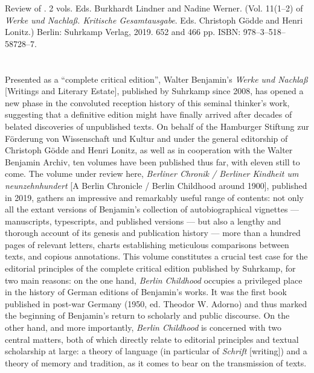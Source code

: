 

\begin{review}
\renewcommand*{\pagemark}{}

\begin{reviewed}
Review of \thecontribution. 2 vols. Eds. Burkhardt Lindner and Nadine
Werner. (Vol. 11(1--2) of \emph{Werke und Nachlaß. Kritische
Gesamtausgabe}. Eds. Christoph Gödde and Henri Lonitz.) Berlin: Suhrkamp Verlag, 2019. 652 and 466 pp. ISBN: 978--3--518--58728--7.
\end{reviewed}

\section*{} 
Presented as a ``complete critical edition'', Walter Benjamin's
\emph{Werke und Nachlaß} {[}Writings and Literary Estate{]}, published
by Suhrkamp since 2008, has opened a new phase in the convoluted
reception history of this seminal thinker's work, suggesting that a
definitive edition might have finally arrived after decades of belated
discoveries of unpublished texts. On behalf of the Hamburger Stiftung
zur Förderung von Wissenschaft und Kultur and under the general
editorship of Christoph Gödde and Henri Lonitz, as well as in
cooperation with the Walter Benjamin Archiv, ten volumes have been
published thus far, with eleven still to come. The volume under review
here, \emph{Berliner Chronik / Berliner Kindheit um neunzehnhundert}
{[}A Berlin Chronicle / Berlin Childhood around 1900{]}, published in
2019, gathers an impressive and remarkably useful range of contents: not
only all the extant versions of Benjamin's collection of
autobiographical vignettes --- manuscripts, typescripts, and published
versions --- but also a lengthy and thorough account of its genesis and
publication history --- more than a hundred pages of relevant letters,
charts establishing meticulous comparisons between texts, and copious
annotations. This volume constitutes a crucial test case for the
editorial principles of the complete critical edition published by
Suhrkamp, for two main reasons: on the one hand, \emph{Berlin Childhood}
occupies a privileged place in the history of German editions of
Benjamin's works. It was the first book published in post-war Germany
(1950, ed. Theodor W. Adorno) and thus marked the beginning of
Benjamin's return to scholarly and public discourse. On the other hand,
and more importantly, \emph{Berlin Childhood} is concerned with two
central matters, both of which directly relate to editorial principles
and textual scholarship at large: a theory of language (in particular of
\emph{Schrift} {[}writing{]}) and a theory of memory and tradition, as
it comes to bear on the transmission of texts.


\end{review}
